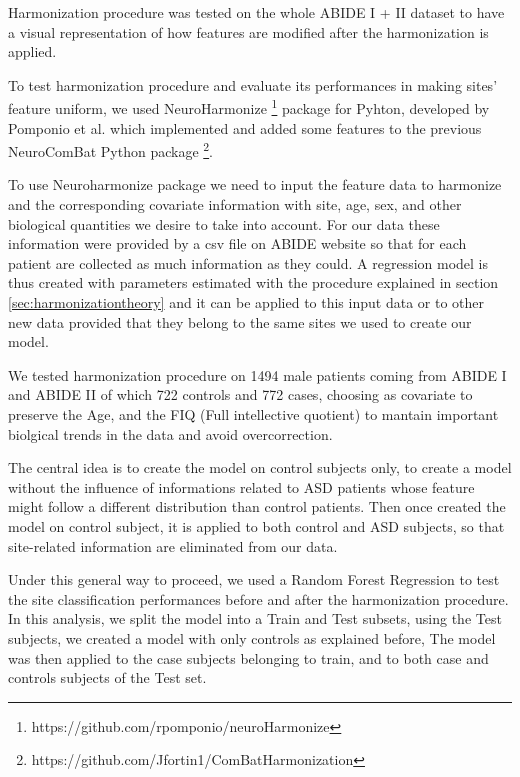 \documentclass[12pt]{report}
\begin{document}
Harmonization procedure was tested on the whole ABIDE I + II dataset to have a visual representation of how features are modified after the harmonization is applied.

To test harmonization procedure and evaluate its performances in making sites' feature uniform, we used NeuroHarmonize \footnote{https://github.com/rpomponio/neuroHarmonize} package for Pyhton, developed by Pomponio et al. \cite{pomponio-2019} which implemented and added some features to the previous NeuroComBat Python package \footnote{https://github.com/Jfortin1/ComBatHarmonization}.

To use Neuroharmonize package we need to input the feature data to harmonize and the corresponding covariate information with site, age, sex, and other biological quantities we desire to take into account.
For our data these information were provided by a csv file on ABIDE website so that for each patient are collected as much information as they could.
A regression model is thus created with parameters estimated with the procedure explained in section \ref{sec:harmonizationtheory} and it can be applied to this input data or to other new data provided that they belong to the same sites we used to create our model.

We tested harmonization procedure on 1494 male patients coming from ABIDE I and ABIDE II of which 722 controls and 772 cases, choosing as covariate to preserve the Age, and the FIQ (Full intellective quotient) to mantain important biolgical trends in the data and avoid overcorrection.


The central idea is to create the model on control subjects only, to create a model without the influence of informations related to ASD patients whose feature might follow a different distribution than control patients.
Then once created the model on control subject, it is applied to both control and ASD subjects, so that site-related information are eliminated from our data.

Under this general way to proceed, we used a Random Forest Regression to test the site classification performances before and after the harmonization procedure.
In this analysis, we split the model into a Train and Test subsets, using the Test subjects, we created a model with only controls as explained before,
The model was then applied to the case subjects belonging to train, and to both case and controls subjects of the Test set.
\end{document}
